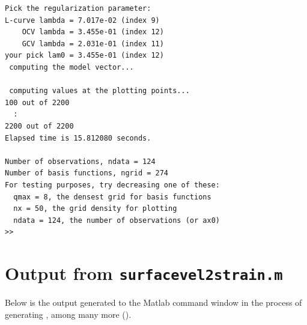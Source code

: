 \documentclass[11pt,titlepage,fleqn]{article}
\begin{document}
\begin{spacing}{1.0}
\begin{verbatim}
Pick the regularization parameter:
L-curve lambda = 7.017e-02 (index 9)
    OCV lambda = 3.455e-01 (index 12)
    GCV lambda = 2.031e-01 (index 11)
your pick lam0 = 3.455e-01 (index 12)
 computing the model vector...
  
 computing values at the plotting points...
100 out of 2200
  :
2200 out of 2200
Elapsed time is 15.812080 seconds.
  
Number of observations, ndata = 124
Number of basis functions, ngrid = 274
For testing purposes, try decreasing one of these:
  qmax = 8, the densest grid for basis functions
  nx = 50, the grid density for plotting
  ndata = 124, the number of observations (or ax0)
>> 
\end{verbatim}
\end{spacing}


\section{Output from {\tt surfacevel2strain.m}}
\label{sec:sphereinterp_out}

Below is the output generated to the Matlab command window in the process of generating , among many more ().
\end{document}
